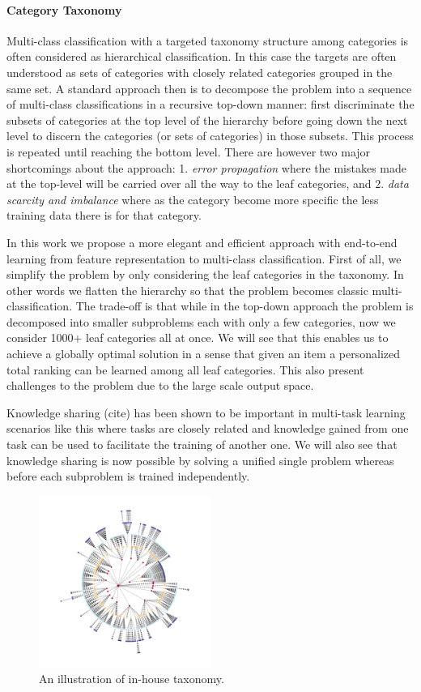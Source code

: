 \paragraph{Category Taxonomy}
Multi-class classification with a targeted taxonomy structure among categories is often considered as hierarchical classification. In this case the targets are often understood as sets of categories with closely related categories grouped in the same set. A standard approach then is to decompose the problem into a sequence of multi-class classifications in a recursive top-down manner: 
first discriminate the subsets of categories at the top level of the hierarchy before going down the next level to discern the categories (or sets of categories) in those subsets. This process is repeated until reaching the bottom level.  
There are however two major shortcomings about the approach: 1. \emph{error propagation} where the mistakes made at the top-level will be carried over all the way to the leaf categories, and 2. \emph{data scarcity and imbalance} where as the category become more specific the less training data there is for that category. 

In this work we propose a more elegant and efficient approach with end-to-end learning from feature representation to multi-class classification. First of all, we simplify the problem by only considering the leaf categories in the taxonomy. In other words we flatten the hierarchy so that the problem becomes classic multi-classification. 
The trade-off is that while in the top-down approach the problem is decomposed into smaller subproblems each with only a few categories, now we consider 1000+ leaf categories all at once. We will see that this enables us to achieve a globally optimal solution in a sense that given an item a personalized total ranking can be learned among all leaf categories. This also present challenges to the problem due to the large scale output space. 

Knowledge sharing (cite) has been shown to be important in multi-task learning scenarios like this where tasks are closely related and knowledge gained from one task can be used to facilitate the training of another one. 
We will also see that knowledge sharing is now possible by solving a unified single problem whereas before each subproblem is trained independently. 

\begin{figure}
\label{fig:taxonomy}
\includegraphics[width=0.5\textwidth]{resources/circular_tree.pdf}
\caption{An illustration of in-house taxonomy.}
\end{figure}


